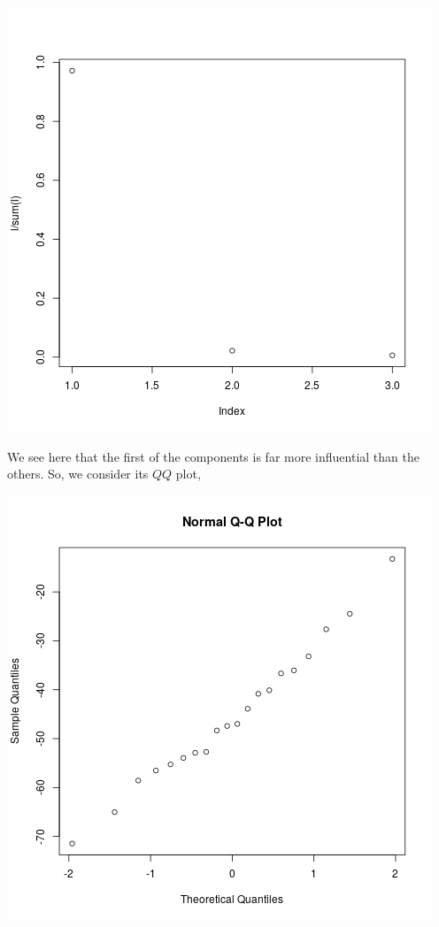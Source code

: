 \documentclass[letterpaper,10pt]{article}
\begin{document}
\begin{description}
\begin{center}
\includegraphics[scale=.75]{eigprop.png}
\end{center}
We see here that the first of the components is far more influential than the others. So, we consider its $QQ$ plot,
\begin{center}
\includegraphics[scale=.75]{1qq.png}

\end{center}
\end{description}
\end{document}
